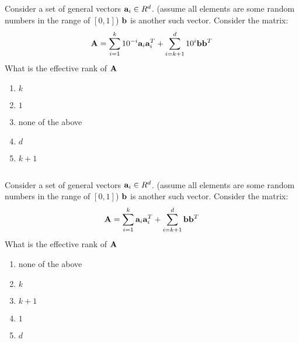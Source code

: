\begin{frame}
\section{}
  Consider a set of general vectors ${\bf a}_i\in R^d$. (assume all elements are some random numbers in the range of $[0,1]$)
  ${\bf b}$ is another such vector. Consider the matrix:
  \[ {\bf A} = \sum_{i=1}^k 10^{-i} {\bf a}_i {\bf a}_i^T + \sum_{i=k+1}^d 10^{i}{\bf b}{\bf b}^T\]
   What is the effective rank of ${\bf A}$
 
\begin{enumerate}[label=(\Alph*)]
\item $k$
\item $1$
\item none of the above
\item $d$
\item $k+1$ 
\end{enumerate}
\end{frame}

\begin{frame}
\section{}
  Consider a set of general vectors ${\bf a}_i\in R^d$. (assume all elements are some random numbers in the range of $[0,1]$)
  ${\bf b}$ is another such vector. Consider the matrix:
     \[ {\bf A} = \sum_{i=1}^k {\bf a}_i {\bf a}_i^T + \sum_{i=k+1}^d {\bf b}{\bf b}^T\]
   What is the effective rank of ${\bf A}$
 
\begin{enumerate}[label=(\Alph*)]
\item none of the above
\item $k$
\item $k+1$
\item $1$
\item $d$ 
\end{enumerate}
\end{frame}
